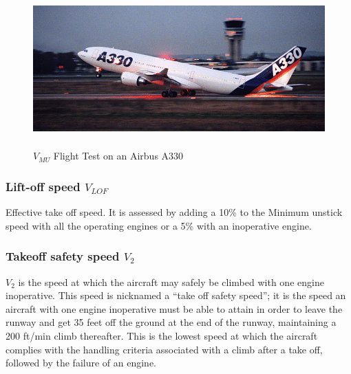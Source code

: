 \begin{figure}[htbp]
	\centering
	\includegraphics[height=6cm, keepaspectratio ]{Immagini/Capitolo2/2_1-VMUFlightTestOnAnA330} 
	\caption{$V_{MU}$ Flight Test on an Airbus A330} %
	\label{fig:figura2_1} %
\end{figure}

\subsubsection{Lift-off speed $V_{LOF}$}
Effective take off speed. It is assessed by adding a 10\% to the Minimum unstick speed with all the operating engines or a 5\% with an inoperative engine.

\subsubsection{Takeoff safety speed $V_2$}
$V_2$ is the speed at which the aircraft may safely be climbed with one engine inoperative. This speed is nicknamed a “take off safety speed”; it is the speed an aircraft with one engine inoperative must be able to attain in order to leave the runway and get 35 feet off the ground at the end of the runway, maintaining a 200 ft/min climb thereafter. This is the lowest speed at which the aircraft complies with the handling criteria associated with a climb after a take off, followed by the failure of an engine.



